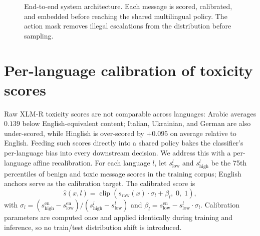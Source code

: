 \documentclass{article}
\begin{document}
\begin{figure}[t]
  \centering
  \caption{End-to-end system architecture. Each message is scored, calibrated,
  and embedded before reaching the shared multilingual policy. The action mask
  removes illegal escalations from the distribution before sampling.}
  \label{fig:architecture}
\end{figure}


\section{Per-language calibration of toxicity scores}
\label{sec:calibration}

Raw XLM-R toxicity scores are not comparable across languages: Arabic averages
$0.139$ below English-equivalent content; Italian, Ukrainian, and German are
also under-scored, while Hinglish is over-scored by $+0.095$ on average relative
to English. Feeding such scores directly into a shared policy bakes the
classifier's per-language bias into every downstream decision. We address this
with a per-language affine recalibration. For each language $l$, let
$s^l_{\text{low}}$ and $s^l_{\text{high}}$ be the 75th percentiles of benign and
toxic message scores in the training corpus; English anchors serve as the
calibration target. The calibrated score is
\begin{equation}\label{eq:calibration}
  \hat{s}(x, l) = \operatorname{clip}(s_{\text{raw}}(x) \cdot \sigma_l + \beta_l,\; 0,\; 1),
\end{equation}
with $\sigma_l = (s^{\text{en}}_{\text{high}} - s^{\text{en}}_{\text{low}}) /
(s^l_{\text{high}} - s^l_{\text{low}})$ and
$\beta_l = s^{\text{en}}_{\text{low}} - s^l_{\text{low}} \cdot \sigma_l$.
Calibration parameters are computed once and applied identically during training
and inference, so no train/test distribution shift is introduced.
\end{document}
